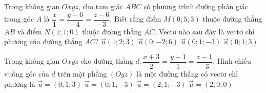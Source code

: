 	\begin{ex}%
	Trong không gian $Oxyz$, cho tam giác $ABC$ có phương trình đường phân giác trong góc $A$ là $\dfrac{x}{1} = \dfrac{y - 6}{-4} = \dfrac{z - 6}{-3}$. Biết rằng điểm $M(0; 5; 3)$ thuộc đường thẳng $AB$ và điểm $N(1; 1; 0)$ thuộc đường thẳng $AC$. Vectơ nào sau đây là vectơ chỉ phương của đường thẳng $AC$?
	\choice
	{$\overrightarrow{u}(1; 2; 3)$}
	{$\overrightarrow{u}(0; -2; 6)$}
	{$\overrightarrow{u}(0; 1; -3)$}
	{\True $\overrightarrow{u}(0; 1; 3)$}
	\end{ex}
	\begin{ex}%
	Trong không gian $Oxyz$ cho đường thẳng $d \colon \dfrac{x+3}{2} = \dfrac{y-1}{1}=\dfrac{z-1}{-3}$. Hình chiếu vuông góc của $d$ trên mặt phẳng $(Oyz)$ là một đường thẳng có vectơ chỉ phương là
	\choice
	{$\overrightarrow{u}=(0;1;3)$}
	{\True $\overrightarrow{u}=(0;1;-3)$}
	{$\overrightarrow{u}=(2;1;-3)$}
	{$\overrightarrow{u}=(2;0;0)$}
	\end{ex}

